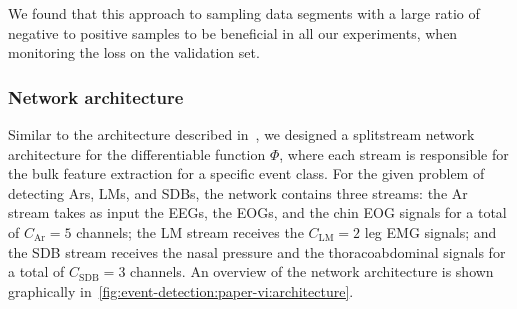 We found that this approach to sampling data segments with a large ratio of negative to positive samples to be beneficial in all our experiments, when monitoring the loss on the validation set.

\subsubsection{Network architecture}
Similar to the architecture described in~\cite{Brink-Kjaer2020}, we designed a splitstream network architecture for the differentiable function \(\Phi\), where each stream is responsible for the bulk feature extraction for a specific event class.
For the given problem of detecting \acp{Ar}, \acp{LM}, and \acp{SDB}, the network contains three streams: the \ac{Ar} stream takes as input the \acp{EEG}, the \acp{EOG}, and the chin \ac{EOG} signals for a total of \(C_\text{Ar} = 5\) channels; the \ac{LM} stream receives the \(C_\text{LM}=2\) leg \ac{EMG} signals; and the \ac{SDB} stream receives the nasal pressure and the thoracoabdominal signals for a total of \(C_\text{SDB}=3\) channels.
An overview of the network architecture is shown graphically in~\cref{fig:event-detection:paper-vi:architecture}.

